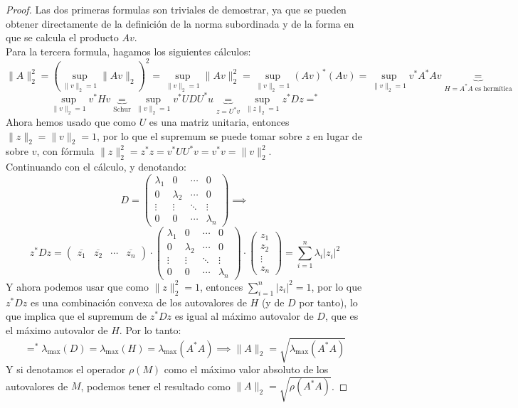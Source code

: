 \begin{proof}
    Las dos primeras formulas son triviales de demostrar, ya que se pueden obtener directamente de la definición de la norma subordinada y de la forma en que se calcula el producto $ Av $.\\
    Para la tercera formula, hagamos los siguientes cálculos:
    \[
        \|A\|_2^2 =
        \left( \sup_{\|v\|_2 = 1} \|Av\|_2 \right)^2 =
        \sup_{\|v\|_2 = 1} \|Av\|_2^2 =
        \sup_{\|v\|_2 = 1} (Av)^* (Av) =
        \sup_{\|v\|_2 = 1} v^* A^* A v \underbrace{=}_{H=A^*A \text{ es hermítica}}
    \]
    \[
        \sup_{\|v\|_2 = 1} v^* H v \underbrace{=}_{\text{Schur}}
        \sup_{\|v\|_2 = 1} v^* U D U^* u \underbrace{=}_{z = U^* v}
        \sup_{\|z\|_2 = 1} z^* D z =^*
    \]
    Ahora hemos usado que como $U$ es una matriz unitaria, entonces $ \|z\|_2 = \|v\|_2 = 1 $, por lo que el supremum se puede tomar sobre $ z $ en lugar de sobre $ v $, con fórmula $ \| z \|_2^2 = z^* z = v^* U U^* v = v^* v = \|v\|_2^2 $.\\
    Continuando con el cálculo, y denotando:
    \[
        D =
        \begin{pmatrix}
            \lambda_1 & 0 & \cdots & 0 \\
            0 & \lambda_2 & \cdots & 0 \\
            \vdots & \vdots & \ddots & \vdots \\
            0 & 0 & \cdots & \lambda_n
        \end{pmatrix}
        \implies
    \]
    \[
        z^* D z =
        \begin{pmatrix}
            \overline{z_1} & \overline{z_2} & \cdots & \overline{z_n}
        \end{pmatrix}
        \cdot
        \begin{pmatrix}
            \lambda_1 & 0 & \cdots & 0 \\
            0 & \lambda_2 & \cdots & 0 \\
            \vdots & \vdots & \ddots & \vdots \\
            0 & 0 & \cdots & \lambda_n
        \end{pmatrix}
        \cdot
        \begin{pmatrix}
            z_1 \\
            z_2 \\
            \vdots \\
            z_n
        \end{pmatrix} =
        \sum_{i=1}^{n} \lambda_i |z_i|^2
    \]
    Y ahora podemos usar que como $ \| z \|_2^2 = 1 $, entonces $ \sum_{i=1}^{n} |z_i|^2 = 1 $, por lo que $z^* D z$ es una combinación convexa de los autovalores de $H$ (y de $D$ por tanto), lo que implica que el supremum de $ z^* D z $ es igual al máximo autovalor de $D$, que es el máximo autovalor de $H$. Por lo tanto:
    \[
        =^*
        \lambda_{\max}(D) =
        \lambda_{\max}(H) =
        \lambda_{\max}(A^* A) \implies
        \|A\|_2 = \sqrt{\lambda_{\max}(A^* A)}
    \]
    Y si denotamos el operador $\rho(M)$ como el máximo valor absoluto de los autovalores de $M$, podemos tener el resultado como $ \|A\|_2 = \sqrt{\rho(A^* A)} $.
\end{proof}

